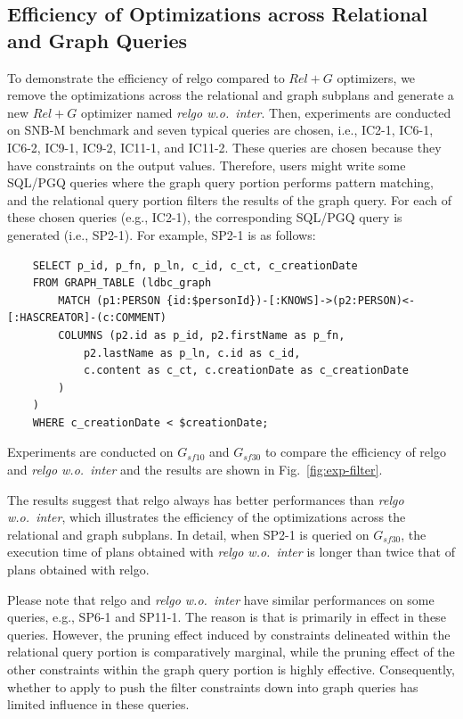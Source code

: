 \subsection{Efficiency of Optimizations across Relational and Graph Queries}
\label{sec:experiment-case-study}

To demonstrate the efficiency of relgo compared to $Rel+G$ optimizers, we remove the optimizations across the relational and graph subplans and generate a new $Rel+G$ optimizer named \textit{relgo w.o.~inter}.
Then, experiments are conducted on SNB-M benchmark and seven typical queries are chosen, i.e., IC2-1, IC6-1, IC6-2, IC9-1, IC9-2, IC11-1, and IC11-2.
These queries are chosen because they have constraints on the output values.
Therefore, users might write some SQL/PGQ queries where the graph query portion performs pattern matching, and the relational query portion filters the results of the graph query.
For each of these chosen queries (e.g., IC2-1), the corresponding SQL/PGQ query is generated (i.e., SP2-1).
For example, SP2-1 is as follows:
\begin{lstlisting}
    SELECT p_id, p_fn, p_ln, c_id, c_ct, c_creationDate
    FROM GRAPH_TABLE (ldbc_graph
        MATCH (p1:PERSON {id:$personId})-[:KNOWS]->(p2:PERSON)<-[:HASCREATOR]-(c:COMMENT)
        COLUMNS (p2.id as p_id, p2.firstName as p_fn,
            p2.lastName as p_ln, c.id as c_id,
            c.content as c_ct, c.creationDate as c_creationDate
        )
    )
    WHERE c_creationDate < $creationDate;
\end{lstlisting}
Experiments are conducted on $G_{sf10}$ and $G_{sf30}$ to compare the efficiency of relgo and \textit{relgo w.o.~inter} and the results are shown in Fig.~\ref{fig:exp-filter}.


The results suggest that relgo always has better performances than \textit{relgo w.o.~inter}, which illustrates the efficiency of the optimizations across the relational and graph subplans.
In detail, when SP2-1 is queried on $G_{sf30}$, the execution time of plans obtained with \textit{relgo w.o.~inter} is longer than twice that of plans obtained with relgo.

Please note that relgo and \textit{relgo w.o.~inter} have similar performances on some queries, e.g., SP6-1 and SP11-1.
The reason is that \filterrule is primarily in effect in these queries.
However, the pruning effect induced by constraints delineated within the relational query portion is comparatively marginal, while the pruning effect of the other constraints within the graph query portion is highly effective.
Consequently, whether to apply \filterrule to push the filter constraints down into graph queries has limited influence in these queries.
